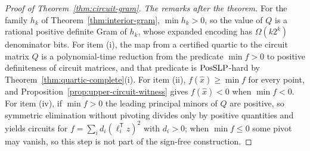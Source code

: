 \begin{proof}[Proof of Theorem~\ref{thm:circuit-gram}]
\emph{The remarks after the theorem.} For the family $h_k$ of
Theorem~\ref{thm:interior-gram}, $\min h_k>0$, so the value of $Q$ is a
rational positive definite Gram of $h_k$, whose expanded encoding has
$\Omega(k2^k)$ denominator bits. For item (i), the map from a certified
quartic to the circuit matrix $Q$ is a polynomial-time reduction from the
predicate $\min f>0$ to positive definiteness of circuit matrices, and that
predicate is $\mathrm{PosSLP}$-hard by Theorem~\ref{thm:quartic-complete}(i). For item
(ii), $f(\hat x)\ge\min f$ for every point, and
Proposition~\ref{prop:upper-circuit-witness} gives $f(\hat x)<0$ when
$\min f<0$. For item (iv), if $\min f>0$ the leading principal minors of $Q$
are positive, so symmetric elimination without pivoting divides only by
positive quantities and yields circuits for
$f=\sum_id_i(\ell_i^{\mathsf T}z)^2$ with $d_i>0$; when $\min f\le0$ some pivot
may vanish, so this step is not part of the sign-free construction.
\end{proof}
